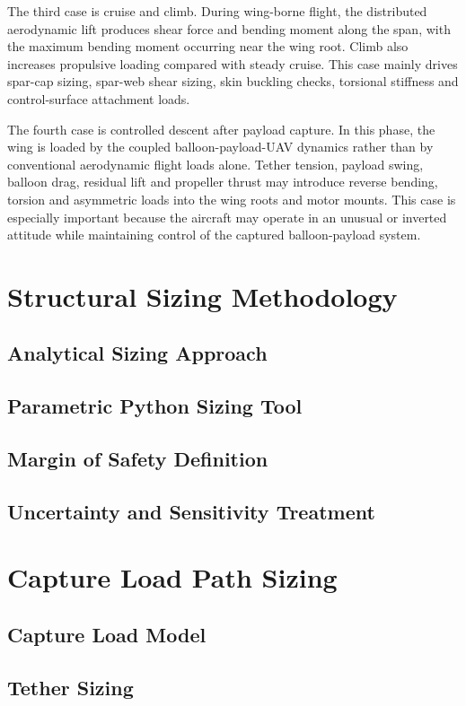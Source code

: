 The third case is cruise and climb. During wing-borne flight, the distributed aerodynamic lift produces shear force and bending moment along the span, with the maximum bending moment occurring near the wing root. Climb also increases propulsive loading compared with steady cruise. This case mainly drives spar-cap sizing, spar-web shear sizing, skin buckling checks, torsional stiffness and control-surface attachment loads.

The fourth case is controlled descent after payload capture. In this phase, the wing is loaded by the coupled balloon-payload-UAV dynamics rather than by conventional aerodynamic flight loads alone. Tether tension, payload swing, balloon drag, residual lift and propeller thrust may introduce reverse bending, torsion and asymmetric loads into the wing roots and motor mounts. This case is especially important because the aircraft may operate in an unusual or inverted attitude while maintaining control of the captured balloon-payload system.



\section{Structural Sizing Methodology}
\subsection{Analytical Sizing Approach}
\subsection{Parametric Python Sizing Tool}
\subsection{Margin of Safety Definition}
\subsection{Uncertainty and Sensitivity Treatment}


\section{Capture Load Path Sizing}
\subsection{Capture Load Model}
\subsection{Tether Sizing}
